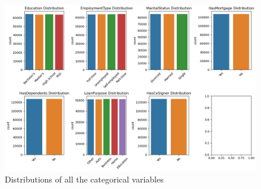\documentclass[12pt]{article}
\begin{document}
\begin{figure}[htbp]
    \centering
    \includegraphics[width=\linewidth]{./code/categoricalvariablesdistributions.png}
    \caption{Distributions of all the categorical variables}
    \label{fig:catvarsdists}
\end{figure}
\end{document}
